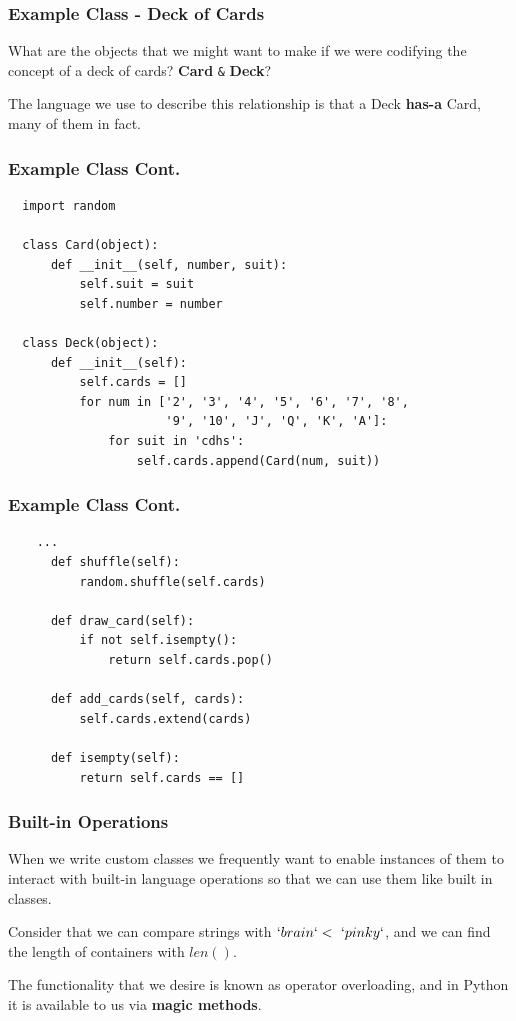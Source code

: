 \documentclass{beamer}
\begin{document}
\begin{frame}
  \frametitle{Example Class - Deck of Cards}
  What are the objects that we might want to make if we were codifying the concept of a deck of cards? \pause \textbf{Card} \texttt{\&} \textbf{Deck}? \vspace{5mm}
  \pause

  The language we use to describe this relationship is that a Deck \textbf{has-a} Card, many of them in fact. \vspace{1mm}
\end{frame}

\begin{frame}[fragile]
  \frametitle{Example Class Cont.}
  \begin{lstlisting}
  import random

  class Card(object):
      def __init__(self, number, suit):
          self.suit = suit
          self.number = number

  class Deck(object):
      def __init__(self):
          self.cards = []
          for num in ['2', '3', '4', '5', '6', '7', '8',
                      '9', '10', 'J', 'Q', 'K', 'A']:
              for suit in 'cdhs':
                  self.cards.append(Card(num, suit))
  \end{lstlisting}
\end{frame}

\begin{frame}[fragile]
  \frametitle{Example Class Cont.}
  \begin{lstlisting}
    ...
      def shuffle(self):
          random.shuffle(self.cards)

      def draw_card(self):
          if not self.isempty():
              return self.cards.pop()

      def add_cards(self, cards):
          self.cards.extend(cards)

      def isempty(self):
          return self.cards == []
  \end{lstlisting}
\end{frame}

\begin{frame}
  \frametitle{Built-in Operations}
  When we write custom classes we frequently want to enable instances of them to interact with built-in language operations so that we can use them like built in classes. \vspace{4mm}
  
  Consider that we can compare strings with $`brain` <\ `pinky`$, and we can find the length of containers with $len()$. \vspace{4mm}
  \pause

  \begin{block}{}
    The functionality that we desire is known as operator overloading, and in Python it is available to us via \textbf{magic methods}.
  \end{block}
\end{frame}
\end{document}
